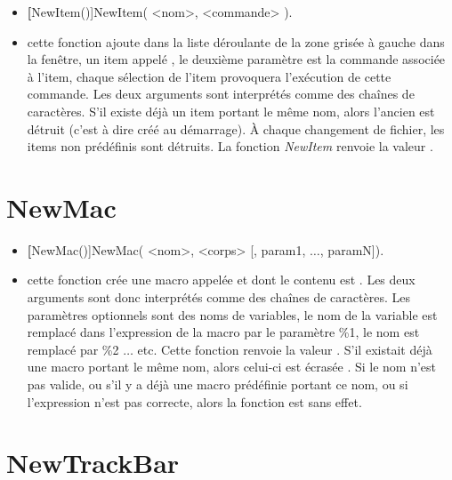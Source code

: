 \begin{itemize}
 \item \util \textbf[NewItem()]{NewItem( <nom>, <commande> )}. 
 \item \desc cette fonction ajoute dans la liste déroulante de la zone grisée à gauche dans la fenêtre, un item appelé , le deuxième paramètre  est la commande associée à l'item, chaque sélection de l'item provoquera l'exécution de cette commande. Les deux arguments sont interprétés comme des chaînes de caractères. S'il existe déjà un item portant le même nom, alors l'ancien est détruit  (c'est à dire créé au démarrage). À chaque changement de fichier, les items non prédéfinis sont détruits. La fonction \textsl{NewItem} renvoie la valeur \Nil.
\end{itemize}

\section{NewMac}\label{cmdNewMac}

\begin{itemize}
 \item \util \textbf[NewMac()]{NewMac( <nom>, <corps> [, param1, $\ldots$, paramN])}.
 \item \desc cette fonction crée une macro appelée  et dont le contenu est . Les deux arguments sont donc interprétés comme des chaînes de caractères. Les paramètres optionnels sont des noms de variables, le nom de la variable  est remplacé dans l'expression de la macro par le paramètre \%1, le nom  est remplacé par \%2 $\ldots$ etc. Cette fonction renvoie la valeur \Nil. S'il existait déjà une macro portant le même nom, alors celui-ci est écrasée . Si le nom n'est pas valide, ou s'il y a déjà une macro prédéfinie portant ce nom, ou si l'expression  n'est pas correcte, alors la fonction est sans effet. 
\end{itemize}

\section{NewTrackBar}\label{cmdNewTrackBar}


